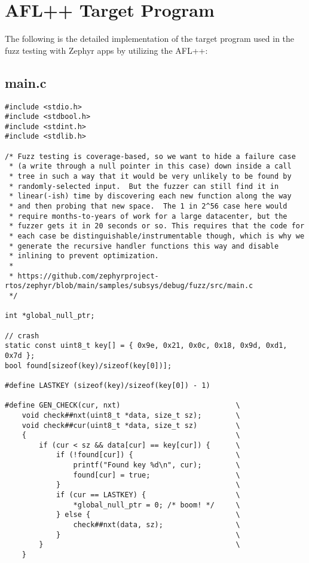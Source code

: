 
\chapter{AFL++ Target Program}\label{appx:first}
The following is the detailed implementation of the
target program\cite{FuzzingE54:online}\cite{zephyrsa35:online} used in
the fuzz testing with Zephyr apps by utilizing the AFL++\cite{257204}:

\section*{main.c}
\begin{verbatim}
#include <stdio.h>
#include <stdbool.h>
#include <stdint.h>
#include <stdlib.h>

/* Fuzz testing is coverage-based, so we want to hide a failure case
 * (a write through a null pointer in this case) down inside a call
 * tree in such a way that it would be very unlikely to be found by
 * randomly-selected input.  But the fuzzer can still find it in
 * linear(-ish) time by discovering each new function along the way
 * and then probing that new space.  The 1 in 2^56 case here would
 * require months-to-years of work for a large datacenter, but the
 * fuzzer gets it in 20 seconds or so. This requires that the code for
 * each case be distinguishable/instrumentable though, which is why we
 * generate the recursive handler functions this way and disable
 * inlining to prevent optimization.
 *
 * https://github.com/zephyrproject-rtos/zephyr/blob/main/samples/subsys/debug/fuzz/src/main.c
 */

int *global_null_ptr;

// crash
static const uint8_t key[] = { 0x9e, 0x21, 0x0c, 0x18, 0x9d, 0xd1, 0x7d };
bool found[sizeof(key)/sizeof(key[0])];

#define LASTKEY (sizeof(key)/sizeof(key[0]) - 1)

#define GEN_CHECK(cur, nxt)                           \
    void check##nxt(uint8_t *data, size_t sz);        \
    void check##cur(uint8_t *data, size_t sz)         \
    {                                                 \
        if (cur < sz && data[cur] == key[cur]) {      \
            if (!found[cur]) {                        \
                printf("Found key %d\n", cur);        \
                found[cur] = true;                    \
            }                                         \
            if (cur == LASTKEY) {                     \
                *global_null_ptr = 0; /* boom! */     \
            } else {                                  \
                check##nxt(data, sz);                 \
            }                                         \
        }                                             \
    }


\end{verbatim}
